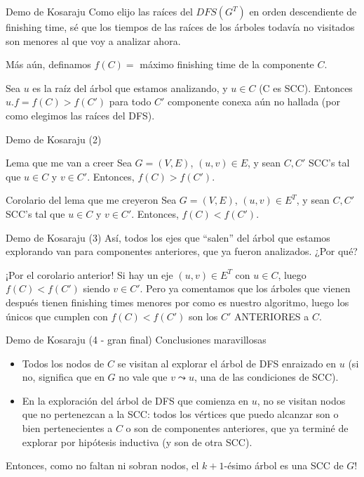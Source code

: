 \documentclass[compress]{beamer}
\newcommand{\bigpause}{\bigskip \pause}
\begin{document}
\begin{frame}{Demo de Kosaraju}
Como elijo las raíces del $DFS(G^T)$ en orden descendiente de 
finishing time, sé que los tiempos de las raíces de los árboles 
todavía no visitados son menores al que voy a analizar ahora.

\bigskip
Más aún, definamos $f(C) = $ máximo finishing time de la componente $C$.

\bigskip
Sea $u$ es la raíz del árbol que estamos analizando, y $u \in C$ (C es SCC).
Entonces $u.f = f(C) > f(C')$ para todo $C'$ componente conexa aún no hallada
(por como elegimos las raíces del DFS).
\end{frame}


\begin{frame}{Demo de Kosaraju (2)}
\begin{block}{Lema que me van a creer}
Sea $G = (V, E)$, $(u, v) \in E$, y sean $C, C'$ SCC's tal que $u \in C$
y $v \in C'$. Entonces, $f(C) > f(C')$.
\end{block}

\begin{block}{Corolario del lema que me creyeron}
Sea $G = (V, E)$, $(u, v) \in E^T$, y sean $C, C'$ SCC's tal que $u \in C$
y $v \in C'$. Entonces, $f(C) < f(C')$.
\end{block}
\end{frame}

\begin{frame}{Demo de Kosaraju (3)}
Así, todos los ejes que ``salen'' del árbol que estamos explorando van para
componentes anteriores, que ya fueron analizados. ¿Por qué?

\bigpause

¡Por el corolario anterior! Si hay un eje $(u,v) \in E^T$ con $u \in C$,
luego $f(C) < f(C')$ siendo $v \in C'$. Pero ya comentamos que los árboles
que vienen después tienen finishing times menores por como es nuestro algoritmo,
luego los únicos que cumplen con $f(C) < f(C')$ son los $C'$ ANTERIORES a $C$.
\end{frame}

\begin{frame}{Demo de Kosaraju (4 - gran final)}
{Conclusiones maravillosas}

\begin{itemize}
\item Todos los nodos de $C$ se visitan al explorar el árbol de DFS enraizado 
en $u$ (si no, significa que en $G$ no vale que $v \leadsto u$, una de las
condiciones de SCC).
\item En la exploración del árbol de DFS que comienza en $u$, no se visitan
nodos que no pertenezcan a la SCC: todos los vértices que puedo alcanzar son
o bien pertenecientes a $C$ o son de componentes anteriores, que ya terminé de
explorar por hipótesis inductiva (y son de otra SCC).
\end{itemize}

Entonces, como no faltan ni sobran nodos, el $k+1$-ésimo árbol es una SCC de $G$!

\end{frame}
\end{document}
